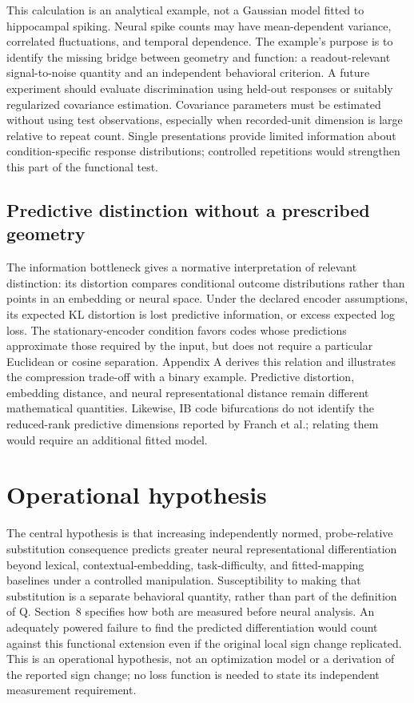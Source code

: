 \documentclass[11pt]{article}
\begin{document}
This calculation is an analytical example, not a Gaussian model fitted
to hippocampal spiking. Neural spike counts may have mean-dependent
variance, correlated fluctuations, and temporal dependence. The
example's purpose is to identify the missing bridge between geometry and
function: a readout-relevant signal-to-noise quantity and an independent
behavioral criterion. A future experiment should evaluate discrimination
using held-out responses or suitably regularized covariance estimation.
Covariance parameters must be estimated without using test observations,
especially when recorded-unit dimension is large relative to repeat
count. Single presentations provide limited information about
condition-specific response distributions; controlled repetitions would
strengthen this part of the functional test.

\hypertarget{predictive-distinction-without-a-prescribed-geometry}{%
\subsection{Predictive distinction without a prescribed
geometry}\label{predictive-distinction-without-a-prescribed-geometry}}

The information bottleneck gives a normative interpretation of relevant
distinction: its distortion compares conditional outcome distributions
rather than points in an embedding or neural space. Under the declared
encoder assumptions, its expected KL distortion is lost predictive
information, or excess expected log loss. The stationary-encoder
condition favors codes whose predictions approximate those required by
the input, but does not require a particular Euclidean or cosine
separation. Appendix A derives this relation and illustrates the
compression trade-off with a binary example. Predictive distortion,
embedding distance, and neural representational distance remain
different mathematical quantities. Likewise, IB code bifurcations do not
identify the reduced-rank predictive dimensions reported by Franch et
al.; relating them would require an additional fitted model.

\hypertarget{operational-hypothesis}{%
\section{Operational hypothesis}\label{operational-hypothesis}}

The central hypothesis is that increasing independently normed,
probe-relative substitution consequence predicts greater neural
representational differentiation beyond lexical, contextual-embedding,
task-difficulty, and fitted-mapping baselines under a controlled
manipulation. Susceptibility to making that substitution is a separate
behavioral quantity, rather than part of the definition of Q. Section~8
specifies how both are measured before neural analysis. An adequately
powered failure to find the predicted differentiation would count
against this functional extension even if the original local sign change
replicated. This is an operational hypothesis, not an optimization model
or a derivation of the reported sign change; no loss function is needed
to state its independent measurement requirement.
\end{document}
